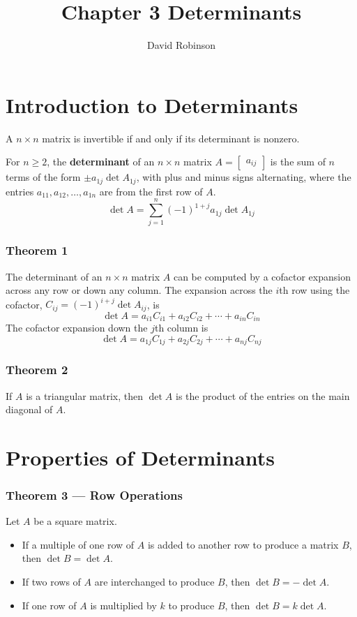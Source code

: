 \documentclass{article}
\title{Chapter 3 Determinants}
\author{David Robinson}
\date{}
\begin{document}
\maketitle

\section*{Introduction to Determinants}
A $n\times n$ matrix is invertible if and only if its determinant is nonzero.

For $n\geq 2$, the \textbf{determinant} of an $n\times n$ matrix
$A=\begin{bmatrix}a_{ij}\end{bmatrix}$ is the sum of $n$ terms of the form
$\pm a_{1j} \det A_{1j}$, with plus and minus signs alternating, where the entries
$a_{11}, a_{12},\ldots , a_{1n}$ are from the first row of $A$.
\[\det A=\sum_{j=1}^{n}{(-1)}^{1+j}a_{1j}\det A_{1j}\]

\subsubsection*{Theorem 1}
The determinant of an $n\times n$ matrix $A$ can be computed by a cofactor expansion across any row
or down any column. The expansion across the $i$th row using the cofactor,
$C_{ij}={(-1)}^{i+j}\det A_{ij}$, is
\[\det A=a_{i1}C_{i1}+a_{i2}C_{i2}+\cdots +a_{in}C_{in}\]
The cofactor expansion down the $j$th column is
\[\det A=a_{1j}C_{1j}+a_{2j}C_{2j}+\cdots +a_{nj}C_{nj}\]

\subsubsection*{Theorem 2}
If $A$ is a triangular matrix, then $\det A$ is the product of the entries on the main diagonal of
$A$.

\pagebreak

\section*{Properties of Determinants}
\subsubsection*{Theorem 3 --- Row Operations}
Let $A$ be a square matrix.
\begin{itemize}
    \item If a multiple of one row of $A$ is added to another row to produce a matrix $B$, then
    $\det B = \det A$.
    \item If two rows of $A$ are interchanged to produce $B$, then $\det B = -\det A$.
    \item If one row of $A$ is multiplied by $k$ to produce $B$, then $\det B = k \det A$.
\end{itemize}
\end{document}
